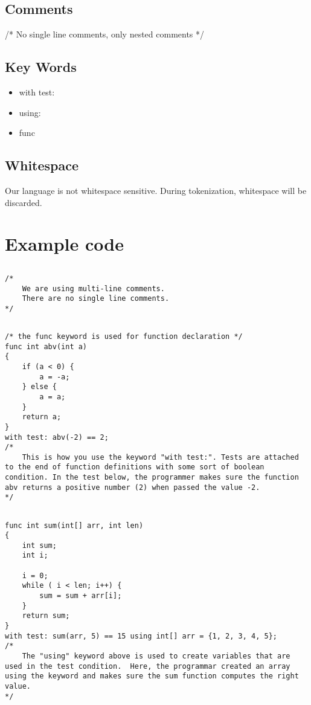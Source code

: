 \documentclass{article}
\begin{document}
\subsection{Comments}

/* No single line comments, only nested comments */

\subsection{Key Words}
\begin{itemize}
	\item
	with test: 
	\item
	using:
	\item 
	func
\end{itemize}

\subsection{Whitespace}
Our language is not whitespace sensitive. During tokenization, whitespace will be discarded.

	
\section{Example code}
\subsection{}
\begin{lstlisting}
/*
	We are using multi-line comments.
	There are no single line comments.
*/
\end{lstlisting}


\subsection{}
\begin{lstlisting}
/* the func keyword is used for function declaration */
func int abv(int a)
{
	if (a < 0) {
		a = -a;
	} else {
		a = a;
	}
	return a;
}
with test: abv(-2) == 2;
/*
	This is how you use the keyword "with test:". Tests are attached to the end of function definitions with some sort of boolean condition. In the test below, the programmer makes sure the function abv returns a positive number (2) when passed the value -2.
*/
\end{lstlisting}


\subsection{}
\begin{lstlisting}
func int sum(int[] arr, int len)
{
	int sum;
	int i;
	
	i = 0;
	while ( i < len; i++) {
		sum = sum + arr[i];
	}
	return sum;
}
with test: sum(arr, 5) == 15 using int[] arr = {1, 2, 3, 4, 5};
/*
	The "using" keyword above is used to create variables that are used in the test condition.  Here, the programmar created an array using the keyword and makes sure the sum function computes the right value.
*/
\end{lstlisting}
\end{document}
